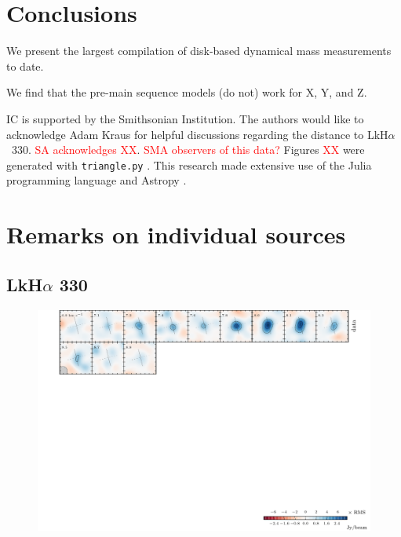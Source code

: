 \documentclass[twocolumn]{aastex6}
\newcommand{\todo}[1]{ \textcolor{red}{#1}}
\begin{document}
\section{Conclusions}

We present the largest compilation of disk-based dynamical mass measurements to date.

We find that the pre-main sequence models (do not) work for X, Y, and Z.

\acknowledgments
IC is supported by the Smithsonian Institution. The authors would like to acknowledge Adam Kraus for helpful discussions regarding the distance to LkH$\alpha$~330. \todo{SA acknowledges XX}. \todo{SMA observers of this data?}  Figures \todo{XX} were generated with \texttt{triangle.py} \citep{foreman-mackey14}. This research made extensive use of the Julia programming language \citep{julia12} and Astropy \citep{astropy13}.




\appendix

\section{Remarks on individual sources}

\subsection{LkH$\alpha$ 330}
\begin{figure}[htb]
\begin{center}
  \includegraphics{LkHa330.pdf}
  \end{center}
\end{figure}
\end{document}
